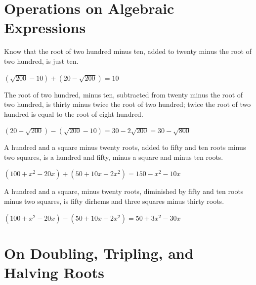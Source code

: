 \documentclass[11pt,a4paper]{book}
\begin{document}
\begin{minipage}[t]{0.48\textwidth}
\raggedright

\section*{Operations on Algebraic Expressions}

Know that the root of two hundred minus ten, added to twenty minus the root of two hundred, is just ten.

$(\sqrt{200} - 10) + (20 - \sqrt{200}) = 10$

\vspace{0.2cm}

The root of two hundred, minus ten, subtracted from twenty minus the root of two hundred, is thirty minus twice the root of two hundred; twice the root of two hundred is equal to the root of eight hundred.

$(20 - \sqrt{200}) - (\sqrt{200} - 10) = 30 - 2\sqrt{200} = 30 - \sqrt{800}$

\vspace{0.2cm}

A hundred and a square minus twenty roots, added to fifty and ten roots minus two squares, is a hundred and fifty, minus a square and minus ten roots.

$(100 + x^2 - 20x) + (50 + 10x - 2x^2) = 150 - x^2 - 10x$

\vspace{0.2cm}

A hundred and a square, minus twenty roots, diminished by fifty and ten roots minus two squares, is fifty dirhems and three squares minus thirty roots.

$(100 + x^2 - 20x) - (50 + 10x - 2x^2) = 50 + 3x^2 - 30x$

\end{minipage}
\vspace{0.3cm}

\newpage

\section*{On Doubling, Tripling, and Halving Roots}
\end{document}
